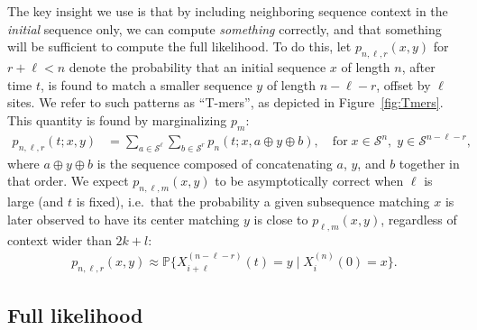 \documentclass{article}
\renewcommand{\P}{\mathbb{P}}
\newcommand{\calS}{\mathcal{S}}  %
\newcommand{\join}{\oplus}  %
\theoremstyle{plain}
\theoremstyle{definition}
\begin{document}
The key insight we use is that by including neighboring sequence context in the \emph{initial} sequence only,
we can compute \emph{something} correctly,
and that something will be sufficient to compute the full likelihood.
To do this, let $p_{n,\ell,r}(x,y)$ for $r+\ell < n$ denote
the probability that an initial sequence $x$ of length $n$, after time $t$,
is found to match a smaller sequence $y$ of length $n-\ell-r$, offset by $\ell$ sites.
We refer to such patterns as ``T-mers'', as depicted in Figure~\ref{fig:Tmers}.
This quantity is found by marginalizing $p_m$:
\begin{align}
    p_{n,\ell,r}(t;x,y) &= \sum_{a \in \calS^\ell} \sum_{b \in \calS^r} p_n(t;x,a \join y \join b) , \quad \text{for}\; x \in \calS^n, \; y \in \calS^{n-\ell-r} ,
\end{align}
where $a \join y \join b$ is the sequence composed of concatenating $a$, $y$, and $b$ together in that order.
We expect $p_{n,\ell,m}(x,y)$ to be asymptotically correct when $\ell$ is large (and $t$ is fixed),
i.e.\ that the probability a given subsequence matching $x$ is later observed to have its center matching $y$
is close to $p_{\ell,m}(x,y)$, regardless of context wider than $2k+l$:
\begin{align} \label{eqn:window_approx}
    p_{n,\ell,r}(x,y) \approx \P\{ X_{i+\ell}^{(n-\ell-r)}(t) = y \mid X_i^{(n)}(0) = x \}.
\end{align}


\subsection{Full likelihood}
\end{document}
